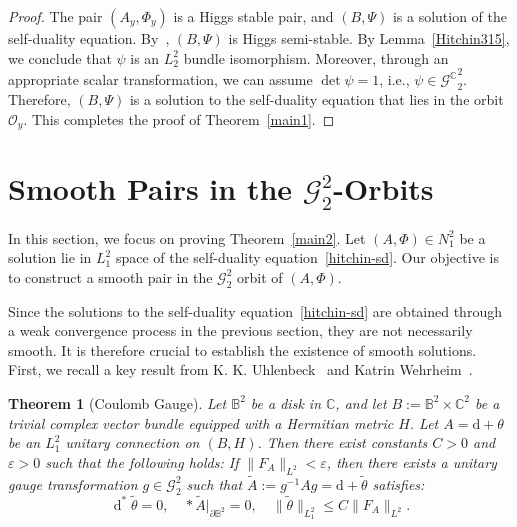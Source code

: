 \documentclass[a4paper]{amsart}
\newtheorem{theorem}{Theorem}[section]
\theoremstyle{definition}
\theoremstyle{remark}
\numberwithin{equation}{section}
\begin{document}
\begin{proof}
The pair $(A_y, \Phi_y)$ is a Higgs stable pair, and $(B, \Psi)$ is a solution of the self-duality equation. By~\cite[Theorem~2.1]{hitchin1987self}, $(B, \Psi)$ is Higgs semi-stable. By Lemma~\ref{Hitchin315}, we conclude that $\psi$ is an $L_2^2$ bundle isomorphism. Moreover, through an appropriate scalar transformation, we can assume $\det \psi = 1$, i.e., $\psi \in {\mathscr{G}^\mathbb{C}}_2^2$. Therefore, $(B, \Psi)$ is a solution to the self-duality equation that lies in the orbit $\mathcal{O}_y$. This completes the proof of Theorem~\ref{main1}.
\end{proof}

\section{Smooth Pairs in the $\mathscr{G}_2^2$-Orbits}

In this section, we focus on proving Theorem~\ref{main2}. Let $(A, \Phi) \in N_1^2$ be a solution lie in $L_1^2$ space of the self-duality equation~\eqref{hitchin-sd}. Our objective is to construct a smooth pair in the $\mathscr{G}_2^2$ orbit of $(A, \Phi)$.

Since the solutions to the self-duality equation~\eqref{hitchin-sd} are obtained through a weak convergence process in the previous section, they are not necessarily smooth. It is therefore crucial to establish the existence of smooth solutions. First, we recall a key result from K. K. Uhlenbeck~\cite[Theorem~1.3]{uhlenbeck1982connections} and Katrin Wehrheim~\cite[Theorem~B]{wehrheim2004uhlenbeck}.

\begin{theorem}[Coulomb Gauge]\label{U-reg}
Let $\mathbb{B}^2$ be a disk in $\mathbb{C}$, and let $B := \mathbb{B}^2 \times \mathbb{C}^2$ be a trivial complex vector bundle equipped with a Hermitian metric $H$. Let $A = \text{d} + \theta$ be an $L_1^2$ unitary connection on $(B, H)$. Then there exist constants $C > 0$ and $\varepsilon > 0$ such that the following holds: If $\|F_A\|_{L^2} < \varepsilon$, then there exists a unitary gauge transformation $g \in \mathscr{G}_2^2$ such that $\tilde{A} := g^{-1} A g = \text{d} + \tilde{\theta}$ satisfies:
\[
\operatorname{d}^* \tilde{\theta} = 0, \quad *\tilde{A}|_{\partial \mathbb{B}^2} = 0, \quad \|\tilde{\theta}\|_{L_1^2} \leq C \|F_A\|_{L^2}.
\]
\end{theorem}
\end{document}
